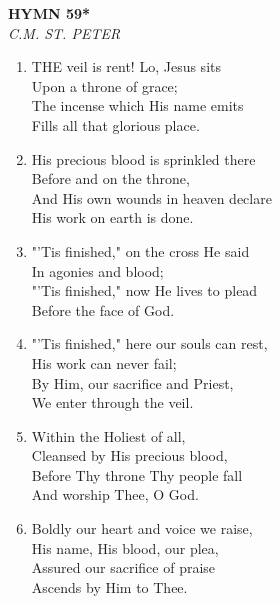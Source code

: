 \newpage
\begin{center}
    {\Large \textbf{HYMN 59*}}
    \\
    \textit{C.M. ST. PETER}
\end{center}
\vspace{1em}

\begin{enumerate}
    \item THE veil is rent! Lo, Jesus sits \\
        Upon a throne of grace; \\
        The incense which His name emits \\
        Fills all that glorious place.

    \item His precious blood is sprinkled there \\
        Before and on the throne, \\
        And His own wounds in heaven declare \\
        His work on earth is done.

    \item "'Tis finished," on the cross He said \\
        In agonies and blood; \\
        "'Tis finished," now He lives to plead \\
        Before the face of God.

    \item "'Tis finished," here our souls can rest, \\
        His work can never fail; \\
        By Him, our sacrifice and Priest, \\
        We enter through the veil.

    \item Within the Holiest of all, \\
        Cleansed by His precious blood, \\
        Before Thy throne Thy people fall \\
        And worship Thee, O God.

    \item Boldly our heart and voice we raise, \\
        His name, His blood, our plea, \\
        Assured our sacrifice of praise \\
        Ascends by Him to Thee.

\end{enumerate}

